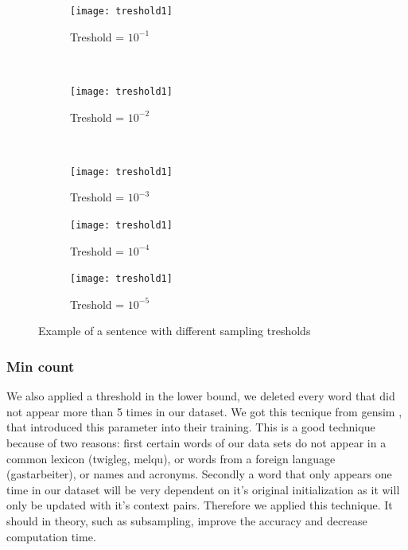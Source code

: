 \begin{figure}
    \centering
    \begin{subfigure}[b]{\textwidth}
        \texttt{[image: treshold1]}
        \caption{Treshold = $10^{-1}$}
        \label{fig:treshold1}
    \end{subfigure}
    ~ %
    \begin{subfigure}[b]{\textwidth}
        \texttt{[image: treshold1]}
        \caption{Treshold = $10^{-2}$}
        \label{fig:treshold2}
    \end{subfigure}
    ~ %
     \begin{subfigure}[b]{\textwidth}
        \texttt{[image: treshold1]}
        \caption{Treshold = $10^{-3}$}
        \label{fig:treshold3}
    \end{subfigure}
   \begin{subfigure}[b]{\textwidth}
        \texttt{[image: treshold1]}
        \caption{Treshold = $10^{-4}$}
        \label{fig:treshold4}
    \end{subfigure}
     \begin{subfigure}[b]{\textwidth}
        \texttt{[image: treshold1]}
        \caption{Treshold = $10^{-5}$}
        \label{fig:treshold5}
    \end{subfigure}
    \caption{Example of a sentence with different sampling tresholds}\label{fig:treshold_examples}
\end{figure}

\subsubsection{Min count}
We also applied a threshold in the lower bound, we deleted every word that did not appear more than 5 times in our dataset. We got this tecnique from gensim \cite{gensim}, that introduced this parameter into their training. This is a good technique because of two reasons: first certain words of our data sets do not appear in a common lexicon (twigleg, melqu), or words from a foreign language (gastarbeiter), or names and acronyms. Secondly a word that only appears one time in our dataset will be very dependent on it's original initialization as it will only be updated with it's context pairs. Therefore we applied this technique. It should in theory, such as subsampling, improve the accuracy and  decrease computation time. 

